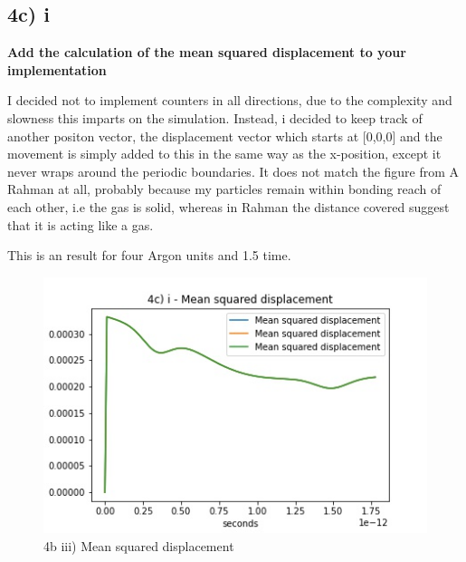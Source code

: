 \documentclass[a4paper,10pt,english]{article}
\begin{document}
\newpage
\subsection{4c) i}
\textbf{Add the calculation of the mean squared displacement to your implementation}

I decided not to implement counters in all directions, due to the complexity and slowness this imparts on the simulation. Instead, i decided to keep track of another positon vector, the displacement vector which starts at [0,0,0] and the movement is simply added to this in the same way as the x-position, except it never wraps around the periodic boundaries. It does not match the figure from A Rahman at all, probably because my particles remain within bonding reach of each other, i.e the gas is solid, whereas in Rahman the distance covered suggest that it is acting like a gas.

This is an result for four Argon units and 1.5 time.
\begin{figure}[h!]
        \centering 
        \includegraphics[scale=0.6]{./py/img/4c_i.jpg} 
        \caption{4b iii) Mean squared displacement}
        \label{fig:4bv}
\end{figure}
\end{document}

